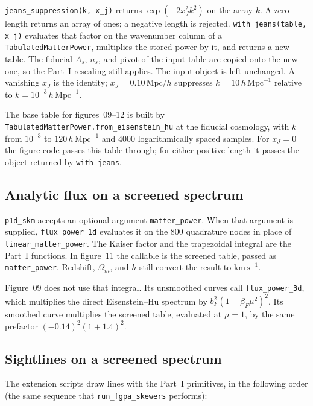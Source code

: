 \documentclass[11pt]{article}
\begin{document}
\texttt{jeans\_suppression(k, x\_j)} returns $\exp(-2 x_J^{2} k^{2})$ on the array $k$.
A zero length returns an array of ones; a negative length is rejected.
\texttt{with\_jeans(table, x\_j)} evaluates that factor on the wavenumber column of a \texttt{TabulatedMatterPower}, multiplies the stored power by it, and returns a new table.
The fiducial $A_s$, $n_s$, and pivot of the input table are copied onto the new one, so the Part~I rescaling still applies.
The input object is left unchanged.
A vanishing $x_J$ is the identity; $x_J=0.10\,\mathrm{Mpc}/h$ suppresses $k=10\,h\,\mathrm{Mpc}^{-1}$ relative to $k=10^{-3}\,h\,\mathrm{Mpc}^{-1}$.

The base table for figures~09--12 is built by \texttt{TabulatedMatterPower.from\_eisenstein\_hu} at the fiducial cosmology, with $k$ from $10^{-3}$ to $120\,h\,\mathrm{Mpc}^{-1}$ and $4000$ logarithmically spaced samples.
For $x_J=0$ the figure code passes this table through; for either positive length it passes the object returned by \texttt{with\_jeans}.

\subsection{Analytic flux on a screened spectrum}

\texttt{p1d\_skm} accepts an optional argument \texttt{matter\_power}.
When that argument is supplied, \texttt{flux\_power\_1d} evaluates it on the $800$ quadrature nodes in place of \texttt{linear\_matter\_power}.
The Kaiser factor and the trapezoidal integral are the Part~I functions.
In figure~11 the callable is the screened table, passed as \texttt{matter\_power}.
Redshift, $\Omega_m$, and $h$ still convert the result to $\mathrm{km\,s}^{-1}$.

Figure~09 does not use that integral.
Its unsmoothed curves call \texttt{flux\_power\_3d}, which multiplies the direct Eisenstein--Hu spectrum by $b_F^{2}(1+\beta_F\mu^{2})^{2}$.
Its smoothed curve multiplies the screened table, evaluated at $\mu=1$, by the same prefactor $(-0.14)^{2}(1+1.4)^{2}$.

\subsection{Sightlines on a screened spectrum}

The extension scripts draw lines with the Part~I primitives, in the following order (the same sequence that \texttt{run\_fgpa\_skewers} performs):
\end{document}
